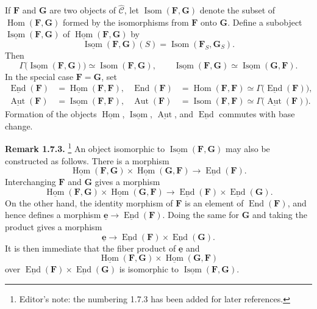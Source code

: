 If \(\mathbf F\) and \(\mathbf G\) are two objects of
\(\widehat{\mathscr C}\), let \(\operatorname{Isom}(\mathbf F,\mathbf G)\)
denote the subset of \(\operatorname{Hom}(\mathbf F,\mathbf G)\) formed by
the isomorphisms from \(\mathbf F\) onto \(\mathbf G\). Define a subobject
\(\underline{\operatorname{Isom}}(\mathbf F,\mathbf G)\) of
\(\underline{\operatorname{Hom}}(\mathbf F,\mathbf G)\) by
\[
  \underline{\operatorname{Isom}}(\mathbf F,\mathbf G)(S)
    =\operatorname{Isom}(\mathbf F_S,\mathbf G_S).
\]
Then
\[
  \Gamma\bigl(\underline{\operatorname{Isom}}
    (\mathbf F,\mathbf G)\bigr)
    \simeq\operatorname{Isom}(\mathbf F,\mathbf G),
  \qquad
  \underline{\operatorname{Isom}}(\mathbf F,\mathbf G)
    \simeq
  \underline{\operatorname{Isom}}(\mathbf G,\mathbf F).
\]
In the special case \(\mathbf F=\mathbf G\), set
\begin{align*}
  \underline{\operatorname{End}}(\mathbf F)
    &=\underline{\operatorname{Hom}}(\mathbf F,\mathbf F),
  &
  \operatorname{End}(\mathbf F)
    &=\operatorname{Hom}(\mathbf F,\mathbf F)
      \simeq\Gamma\bigl(\underline{\operatorname{End}}(\mathbf F)\bigr),\\
  \underline{\operatorname{Aut}}(\mathbf F)
    &=\underline{\operatorname{Isom}}(\mathbf F,\mathbf F),
  &
  \operatorname{Aut}(\mathbf F)
    &=\operatorname{Isom}(\mathbf F,\mathbf F)
      \simeq\Gamma\bigl(\underline{\operatorname{Aut}}(\mathbf F)\bigr).
\end{align*}
Formation of the objects
\(\underline{\operatorname{Hom}}\),
\(\underline{\operatorname{Isom}}\),
\(\underline{\operatorname{Aut}}\), and
\(\underline{\operatorname{End}}\) commutes with base change.

\medskip
\noindent\textbf{Remark 1.7.3.}
\footnote{Editor's note: the numbering 1.7.3 has been added for later
references.}
An object isomorphic to
\(\underline{\operatorname{Isom}}(\mathbf F,\mathbf G)\) may also be
constructed as follows. There is a morphism
\[
  \underline{\operatorname{Hom}}(\mathbf F,\mathbf G)
    \times
  \underline{\operatorname{Hom}}(\mathbf G,\mathbf F)
    \longrightarrow
  \underline{\operatorname{End}}(\mathbf F).
\]
Interchanging \(\mathbf F\) and \(\mathbf G\) gives a morphism
\[
  \underline{\operatorname{Hom}}(\mathbf F,\mathbf G)
    \times
  \underline{\operatorname{Hom}}(\mathbf G,\mathbf F)
    \longrightarrow
  \underline{\operatorname{End}}(\mathbf F)
    \times
  \underline{\operatorname{End}}(\mathbf G).
\]
On the other hand, the identity morphism of \(\mathbf F\) is an element of
\(\operatorname{End}(\mathbf F)\), and hence defines a morphism
\(\underline{\mathbf e}\to
\underline{\operatorname{End}}(\mathbf F)\). Doing the same for
\(\mathbf G\) and taking the product gives a morphism
\[
  \underline{\mathbf e}\longrightarrow
  \underline{\operatorname{End}}(\mathbf F)
    \times
  \underline{\operatorname{End}}(\mathbf G).
\]
It is then immediate that the fiber product of \(\underline{\mathbf e}\)
and
\[
  \underline{\operatorname{Hom}}(\mathbf F,\mathbf G)
    \times
  \underline{\operatorname{Hom}}(\mathbf G,\mathbf F)
\]
over
\(\underline{\operatorname{End}}(\mathbf F)
\times\underline{\operatorname{End}}(\mathbf G)\)
is isomorphic to
\(\underline{\operatorname{Isom}}(\mathbf F,\mathbf G)\).

